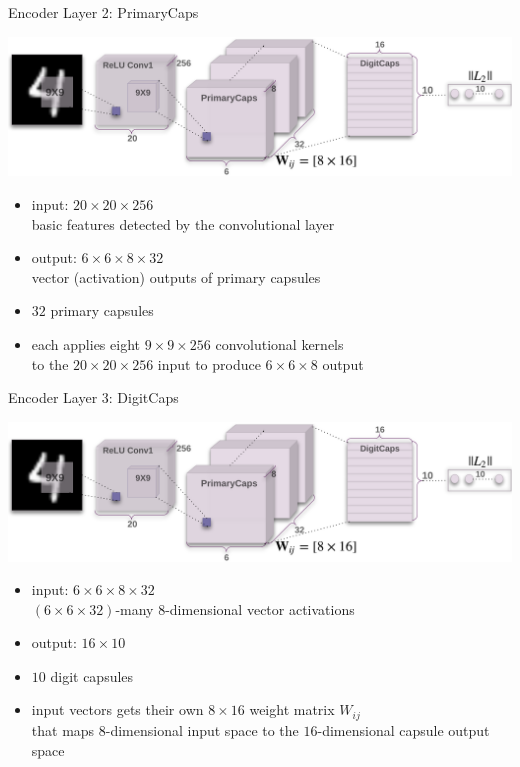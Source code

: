 \documentclass{beamer}
\begin{document}
{    \begin{frame}{Encoder Layer 2: PrimaryCaps}
      \begin{center}
        \includegraphics[width=\textwidth]{../img/capsulearch.png}
      \end{center}
      \pause

      \begin{itemize}[<+- | alert@+>]
        \item input: $20 \times 20 \times 256$ \\
          {\tiny basic features detected by the convolutional layer}
        \item output: $6 \times 6 \times 8 \times 32$ \\
          {\tiny vector (activation) outputs of primary capsules}
        \item $32$ primary capsules
        \item each applies eight $9 \times 9 \times 256$ convolutional kernels \\
          {\tiny to the $20 \times 20 \times 256$ input to produce $6 \times 6 \times 8$ output}
      \end{itemize}
    \end{frame}

    \begin{frame}{Encoder Layer 3: DigitCaps}
      \begin{center}
        \includegraphics[width=\textwidth]{../img/capsulearch.png}
      \end{center}
      \pause

      \begin{itemize}[<+- | alert@+>]
        \item input: $6 \times 6 \times 8 \times 32$ \\
          {\tiny $(6 \times 6 \times 32)$-many $8$-dimensional vector activations}
        \item output: $16 \times 10$ \\
        \item $10$ digit capsules
        \item input vectors gets their own $8 \times 16$ weight matrix $W_{ij}$ \\
          {\tiny that maps $8$-dimensional input space to the $16$-dimensional capsule output space}
      \end{itemize}
    \end{frame}
  }
\end{document}
